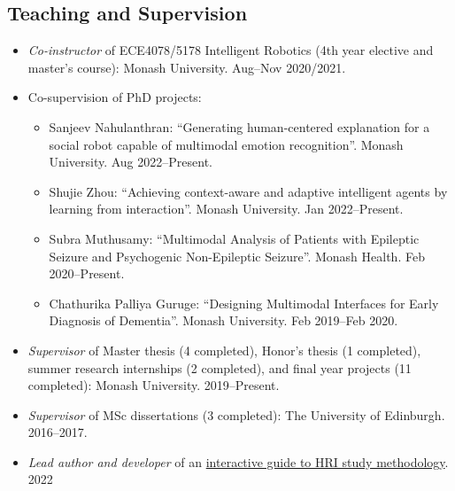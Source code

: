 \documentclass[11pt,letterpaper]{article}
\begin{document}
\begin{itemize}
\end{itemize}


\subsection*{Teaching and Supervision}
\begin{itemize}
  \item \emph{Co-instructor} of ECE4078/5178 Intelligent Robotics (4th year elective and master's course): Monash University. Aug--Nov 2020/2021.
  \item Co-supervision of PhD projects:
  \begin{itemize}
    \item Sanjeev Nahulanthran: ``Generating human-centered explanation for a social robot capable of multimodal emotion recognition''. Monash University. Aug 2022--Present.
    \item Shujie Zhou: ``Achieving context-aware and adaptive intelligent agents by learning from interaction''. Monash University. Jan 2022--Present.
    \item Subra Muthusamy: ``Multimodal Analysis of Patients with Epileptic Seizure and Psychogenic Non-Epileptic Seizure''. Monash Health. Feb 2020--Present.
    \item Chathurika Palliya Guruge: ``Designing Multimodal Interfaces for Early Diagnosis of Dementia''. Monash University. Feb 2019--Feb 2020.
  \end{itemize}
  \item \emph{Supervisor} of Master thesis (4 completed), Honor's thesis (1 completed), summer research internships (2 completed), and final year projects (11 completed): Monash University. 2019--Present.
  \item \emph{Supervisor} of MSc dissertations (3 completed): The University of Edinburgh. 2016--2017.
  \item \emph{Lead author and developer} of an \href{https://tianleimin.github.io/HRI-Methodology-Guidelines/}{interactive guide to HRI study methodology}. 2022
\end{itemize}
\end{document}
